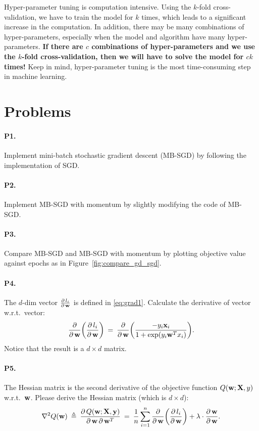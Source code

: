 \documentclass[11pt]{article}
\numberwithin{equation}{section}
\def\w{{\bf w}}
\def\X{{\bf X}}
\def\x{{\bf x}}
\def\y{{\bf y}}
\begin{document}
Hyper-parameter tuning is computation intensive.
Using the $k$-fold cross-validation, we have to train the model for $k$ times, which leads to a significant increase in the computation.
In addition, there may be many combinations of hyper-parameters, especially when the model and algorithm have many hyper-parameters.
\textbf{If there are $c$ combinations of hyper-parameters and we use the $k$-fold cross-validation,
	then we will have to solve the model for $ck$ times!}
Keep in mind, hyper-parameter tuning is the most time-consuming step in machine learning.


\section{Problems}

\paragraph{P1.}
Implement mini-batch stochastic gradient descent (MB-SGD) by following the implementation of SGD.


\paragraph{P2.}
Implement MB-SGD with momentum by slightly modifying the code of MB-SGD.


\paragraph{P3.}
Compare MB-SGD and MB-SGD with momentum by plotting objective value against epochs as in Figure~\ref{fig:compare_gd_sgd}.

\paragraph{P4.}
The $d$-dim vector $\frac{ \partial \, l_i }{\partial \, \w }$ is defined in \eqref{eq:grad1}.
Calculate the derivative of vector w.r.t.\ vector:
\begin{equation*}
\frac{ \partial  }{\partial \, \w } \bigg( \frac{ \partial \, l_i }{\partial \, \w } \bigg)
\: = \: \frac{ \partial  }{\partial \, \w }  \bigg( \frac{ - y_i \x_i }{1+\exp({y_i \w^T x_i})} \bigg) .
\end{equation*}
Notice that the result is a $d\times d$ matrix.

\paragraph{P5.}
The Hessian matrix is the second derivative of the objective function $Q (\w; \X, y)$ w.r.t.\ $\w$.
Please derive the Hessian matrix (which is $d\times d$):
\begin{equation*}
\nabla^2 Q (\w) 
\: \triangleq \: 
\frac{ \partial \, Q (\w; \X, \y) }{ \partial \, \w \, \partial \, \w^T }
\: = \:
\frac{1}{n} \sum_{i=1}^n 
\frac{ \partial  }{ \partial \, \w} \bigg(\frac{ \partial \, l_i }{ \partial \, \w} \bigg)
+ {\lambda} \cdot
\frac{ \partial \, \w }{ \partial \, \w} .
\end{equation*}
\end{document}
